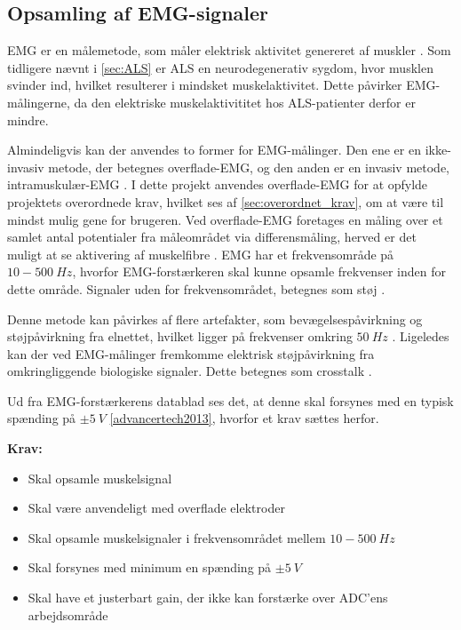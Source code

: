 \subsection{Opsamling af EMG-signaler} \label{sec:EMG_krav}
EMG er en målemetode, som måler elektrisk aktivitet genereret af muskler \citep{chowdhury2013}. 
Som tidligere nævnt i \autoref{sec:ALS} er ALS en neurodegenerativ sygdom, hvor musklen svinder ind, hvilket resulterer i mindsket muskelaktivitet. Dette påvirker EMG-målingerne, da den elektriske muskelaktivititet hos ALS-patienter derfor er mindre.

Almindeligvis kan der anvendes to former for EMG-målinger. Den ene er en ikke-invasiv metode, der betegnes overflade-EMG, og den anden er en invasiv metode, intramuskulær-EMG \citep{chowdhury2013, keenan2012}. I dette projekt anvendes overflade-EMG for at opfylde projektets overordnede krav, hvilket ses af \autoref{sec:overordnet_krav}, om at være til mindst mulig gene for brugeren. Ved overflade-EMG foretages en måling over et samlet antal potentialer fra måleområdet via differensmåling, herved er det muligt at se aktivering af muskelfibre \citep{keenan2012}. EMG har et frekvensområde på $10-500~Hz$, hvorfor EMG-forstærkeren skal kunne opsamle frekvenser inden for dette område. Signaler uden for frekvensområdet, betegnes som støj \citep{morre2003, keenan2012}.  

Denne metode kan påvirkes af flere artefakter, som bevægelsespåvirkning og støjpåvirkning fra elnettet, hvilket ligger på frekvenser omkring $50~Hz$ \citep{keenan2012}.
Ligeledes kan der ved EMG-målinger fremkomme elektrisk støjpåvirkning fra omkringliggende biologiske signaler. Dette betegnes som crosstalk \citep{keenan2012}. 

Ud fra EMG-forstærkerens datablad ses det, at denne skal forsynes med en typisk spænding på $\pm 5~V$ \autoref{advancertech2013}, hvorfor et krav sættes herfor.

\vspace{3mm}
\textbf{Krav:}
\begin{itemize}
\item Skal opsamle muskelsignal
\item Skal være anvendeligt med overflade elektroder
\item Skal opsamle muskelsignaler i frekvensområdet mellem $10-500~Hz$
\item Skal forsynes med minimum en spænding på $\pm5~V$ 
\item Skal have et justerbart gain, der ikke kan forstærke over ADC'ens arbejdsområde
\end{itemize}